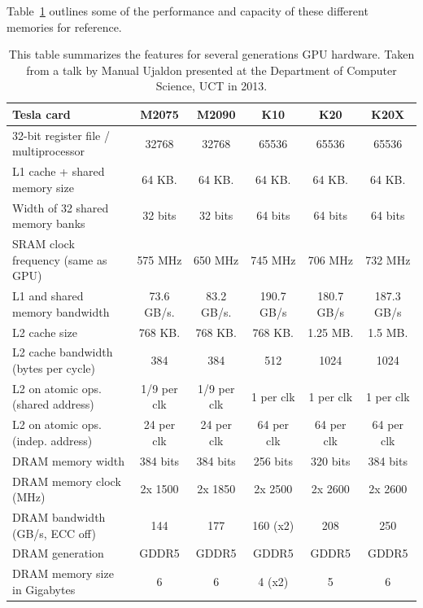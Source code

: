 Table~\ref{tbl_mem_features} outlines some of the performance and capacity of these different memories for reference.
\begin{table}[ht]
  \centering
  \begin{tabular}[c]{|p{3.5cm}|c|c|c|c|c|}
    \hline
    \cellcolor[gray]{0.65} Tesla card & \cellcolor[gray]{0.65} M2075 & \cellcolor[gray]{0.65} M2090 & \cellcolor[gray]{0.65} K10 & \cellcolor[gray]{0.65} K20 & \cellcolor[gray]{0.65} K20X \\
    \hline
    \cellcolor[gray]{0.8} 32-bit register file / multiprocessor & 32768 & 32768 & 65536 & 65536 & 65536 \\
    \hline
    \cellcolor[gray]{0.8} L1 cache + shared memory size & 64 KB. & 64 KB. & 64 KB. & 64 KB. & 64 KB. \\
    \hline
    \cellcolor[gray]{0.8} Width of 32 shared memory banks & 32 bits & 32 bits & 64 bits & 64 bits & 64 bits \\
    \hline
    \cellcolor[gray]{0.8} SRAM clock frequency (same as GPU) & 575 MHz & 650 MHz & 745 MHz & 706 MHz & 732 MHz \\
    \hline
    \cellcolor[gray]{0.8} L1 and shared memory bandwidth & 73.6 GB/s. & 83.2 GB/s. & 190.7 GB/s & 180.7 GB/s & 187.3 GB/s \\
    \hline
    \cellcolor[gray]{0.8} L2 cache size & 768 KB. & 768 KB. & 768 KB. & 1.25 MB. & 1.5 MB. \\
    \hline
    \cellcolor[gray]{0.8} L2 cache bandwidth (bytes per cycle) & 384 & 384 & 512 & 1024 & 1024 \\
    \hline
    \cellcolor[gray]{0.8} L2 on atomic ops. (shared address) & 1/9 per clk & 1/9 per clk & 1 per clk & 1 per clk & 1 per clk \\
    \hline
    \cellcolor[gray]{0.8} L2 on atomic ops. (indep. address) & 24 per clk & 24 per clk & 64 per clk & 64 per clk & 64 per clk \\
    \hline
    \cellcolor[gray]{0.8} DRAM memory width & 384 bits & 384 bits & 256 bits & 320 bits & 384 bits \\
    \hline
    \cellcolor[gray]{0.8} DRAM memory clock (MHz) & 2x 1500 & 2x 1850 & 2x 2500 & 2x 2600 & 2x 2600 \\
    \hline
    \cellcolor[gray]{0.8} DRAM bandwidth (GB/s, ECC off) & 144 & 177 & 160 (x2) & 208 & 250 \\
    \hline
    \cellcolor[gray]{0.8} DRAM generation & GDDR5 & GDDR5 & GDDR5 & GDDR5 & GDDR5 \\
    \hline
    \cellcolor[gray]{0.8} DRAM memory size in Gigabytes & 6 & 6 & 4 (x2) & 5 & 6 \\
    \hline
  \end{tabular}
  \caption[Memory features]{This table summarizes the features for several generations
			    GPU hardware. Taken from a talk by Manual Ujaldon presented at
			    the Department of Computer Science, UCT in 2013.}
  \label{tbl_mem_features}
\end{table}
